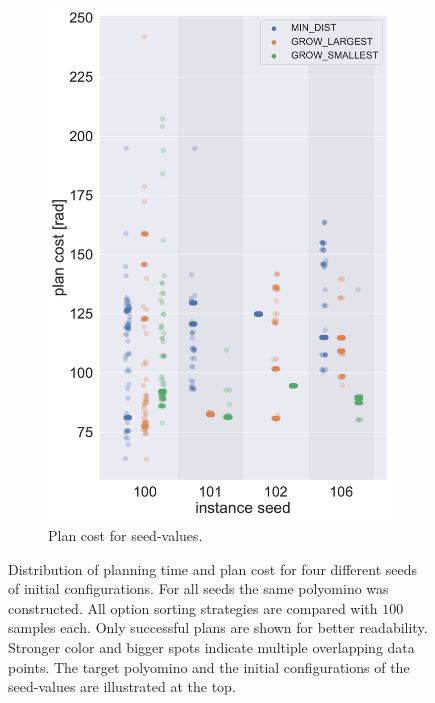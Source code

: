 \begin{figure}
\begin{subfigure}[h]{0.5\textwidth}
		\label{fig:AR_time}
	\end{subfigure}%
	\begin{subfigure}[h]{0.5\textwidth}
		\centering
		\includegraphics[width=\textwidth]{figures/plots/AR_cost.pdf}
		\caption{Plan cost for seed-values.}
		\label{fig:AR_cost}
	\end{subfigure}
	\caption[Planning time and plan cost for different seeds]{Distribution of planning time and plan cost for four different seeds of initial configurations. For all seeds the same polyomino was constructed. All option sorting strategies are compared with $100$ samples each. Only successful plans are shown for better readability. Stronger color and bigger spots indicate multiple overlapping data points. The target polyomino and the initial configurations of the seed-values are illustrated at the top.}
	\label{fig:AR}
\end{figure}

